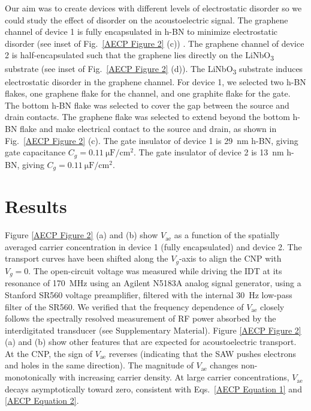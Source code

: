 \documentclass{beavtex_dub_edit}
\begin{document}
Our aim was to create devices with different levels of electrostatic disorder so we could study the effect of disorder on the acoustoelectric signal. The graphene channel of device 1 is fully encapsulated in h-BN to minimize electrostatic disorder (see inset of Fig.\ \ref{AECP Figure 2} (c)) \cite{dean_boron_2010}. The graphene channel of device 2 is half-encapsulated such that the graphene lies directly on the LiNbO\textsubscript{3} substrate (see inset of Fig.\ \ref{AECP Figure 2} (d)). The LiNbO\textsubscript{3} substrate induces electrostatic disorder in the graphene channel. For device 1, we selected two h-BN flakes, one graphene flake for the channel, and one graphite flake for the gate. The bottom h-BN flake was selected to cover the gap between the source and drain contacts. The graphene flake was selected to extend beyond the bottom h-BN flake and make electrical contact to the source and drain, as shown in Fig.\ \ref{AECP Figure 2} (c). The gate insulator of device 1 is \SI{29}{\nano\meter} h-BN, giving gate capacitance $C_g = \SI{0.11}{\micro\farad/\centi\meter^2}$. The gate insulator of device 2 is \SI{13}{\nano\meter} h-BN, giving $C_g = \SI{0.11}{\micro\farad/\centi\meter^2}$. 

\section{Results} \label{AE charge pumping results}

Figure \ref{AECP Figure 2} (a) and (b) show $V_{\mathrm{ae}}$ as a function of the spatially averaged carrier concentration in device 1 (fully encapsulated) and device 2. The transport curves have been shifted along the $V_g$-axis to align the CNP with $V_g=0$. The open-circuit voltage was measured while driving the IDT at its resonance of \SI{170}{\mega\hertz} using an Agilent N5183A analog signal generator, using a Stanford SR560 voltage preamplifier, filtered with the internal \SI{30}{\hertz} low-pass filter of the SR560. We verified that the frequency dependence of $V_{\mathrm{ae}}$ closely follows the spectrally resolved measurement of RF power absorbed by the interdigitated transducer (see Supplementary Material). Figure \ref{AECP Figure 2} (a) and (b) show other features that are expected for acoustoelectric transport. At the CNP, the sign of $V_{\mathrm{ae}}$ reverses (indicating that the SAW pushes electrons and holes in the same direction). The magnitude of $V_{\mathrm{ae}}$ changes non-monotonically with increasing carrier density. At large carrier concentrations, $V_{\mathrm{ae}}$ decays asymptotically toward zero, consistent with Eqs.\ \ref{AECP Equation 1} and \ref{AECP Equation 2}. 
\end{document}
